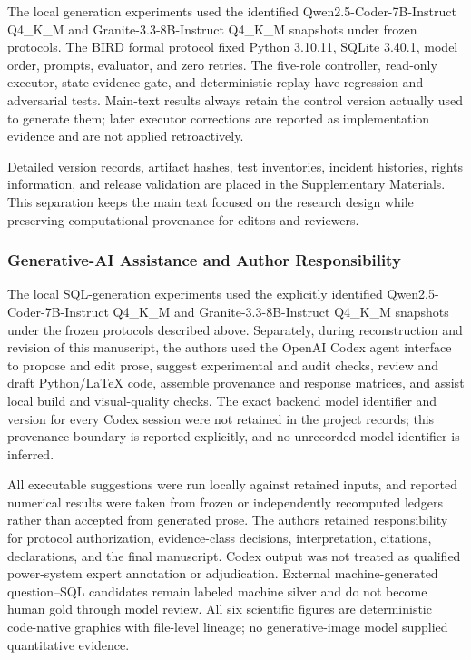 \documentclass[applsci,article,submit,moreauthors]{Definitions/mdpi}
\begin{document}
The local generation experiments used the identified Qwen2.5-Coder-7B-Instruct Q4\_K\_M and Granite-3.3-8B-Instruct Q4\_K\_M snapshots under frozen protocols. The BIRD formal protocol fixed Python 3.10.11, SQLite 3.40.1, model order, prompts, evaluator, and zero retries. The five-role controller, read-only executor, state-evidence gate, and deterministic replay have regression and adversarial tests. Main-text results always retain the control version actually used to generate them; later executor corrections are reported as implementation evidence and are not applied retroactively.

Detailed version records, artifact hashes, test inventories, incident histories, rights information, and release validation are placed in the Supplementary Materials. This separation keeps the main text focused on the research design while preserving computational provenance for editors and reviewers.

\subsubsection{Generative-AI Assistance and Author Responsibility}

The local SQL-generation experiments used the explicitly identified Qwen2.5-Coder-7B-Instruct Q4\_K\_M and Granite-3.3-8B-Instruct Q4\_K\_M snapshots under the frozen protocols described above. Separately, during reconstruction and revision of this manuscript, the authors used the OpenAI Codex agent interface to propose and edit prose, suggest experimental and audit checks, review and draft Python/\LaTeX{} code, assemble provenance and response matrices, and assist local build and visual-quality checks. The exact backend model identifier and version for every Codex session were not retained in the project records; this provenance boundary is reported explicitly, and no unrecorded model identifier is inferred.

All executable suggestions were run locally against retained inputs, and reported numerical results were taken from frozen or independently recomputed ledgers rather than accepted from generated prose. The authors retained responsibility for protocol authorization, evidence-class decisions, interpretation, citations, declarations, and the final manuscript. Codex output was not treated as qualified power-system expert annotation or adjudication. External machine-generated question--SQL candidates remain labeled machine silver and do not become human gold through model review. All six scientific figures are deterministic code-native graphics with file-level lineage; no generative-image model supplied quantitative evidence.
\end{document}
